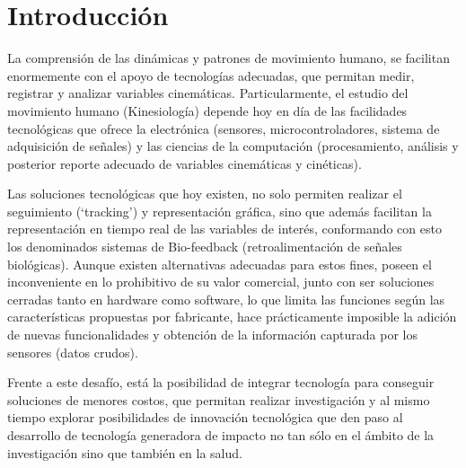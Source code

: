 \documentclass[12pt,a4paper]{article}
\begin{document}
\thispagestyle{empty}
\tableofcontents %
\thispagestyle{empty}
\listoffigures
\thispagestyle{empty}
\newpage
\listoftables

\thispagestyle{empty}
\pagebreak
\setcounter{page}{1}

\let\stdsection\section
\renewcommand\section{\newpage\stdsection}



\section{Introducción}
La comprensión de las dinámicas y patrones de movimiento humano, se facilitan enormemente con el apoyo de tecnologías adecuadas, que permitan medir, registrar y analizar variables cinemáticas. Particularmente, el estudio del movimiento humano (Kinesiología) depende hoy en día de las facilidades tecnológicas que ofrece la electrónica (sensores, microcontroladores, sistema de adquisición de señales) y las ciencias de la computación (procesamiento, análisis y posterior reporte adecuado de  variables cinemáticas y cinéticas).  

Las soluciones tecnológicas que hoy existen, no solo permiten realizar el seguimiento (‘tracking’) y representación gráfica, sino que además facilitan la representación en tiempo real de las variables de interés, conformando con esto los denominados sistemas de Bio-feedback (retroalimentación de señales biológicas). Aunque existen alternativas adecuadas para estos fines, poseen el inconveniente en lo prohibitivo de su valor comercial, junto con ser soluciones cerradas tanto en hardware como software, lo que limita las funciones según las características propuestas por fabricante, hace prácticamente imposible la adición de nuevas funcionalidades y obtención de la información capturada por los sensores (datos crudos).

Frente a este desafío, está la posibilidad de integrar tecnología para conseguir soluciones de menores costos, que permitan realizar investigación y al mismo tiempo explorar posibilidades de innovación tecnológica que den paso al desarrollo de tecnología generadora de impacto no tan sólo en el ámbito de la investigación sino que también en la salud.
\end{document}
